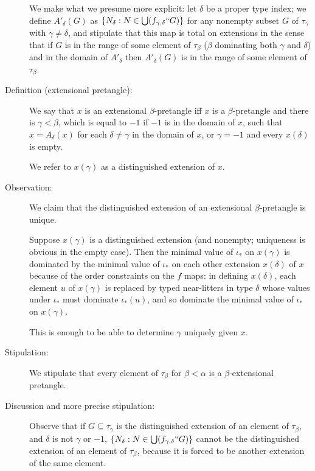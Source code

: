 \documentclass[112pt]{article}
\begin{document}
\begin{description}
We make what we presume more explicit:  let $\delta$ be a proper type index;  we define $A'_\delta(G)$ as $\{N_\delta:N \in \bigcup (f_{\gamma,\delta}``G)\}$ for any nonempty subset $G$ of $\tau_\gamma$ with $\gamma \neq \delta$, and stipulate that this map is total on extensions in the sense
that if $G$ is in the range of some element of $\tau_\beta$ ($\beta$ dominating both $\gamma$ and $\delta$) and in the domain of $A'_\delta$ then $A'_\delta(G)$ is in the range of some element of $\tau_\beta$.

\item[Definition (extensional pretangle):]  We say that $x$ is an extensional $\beta$-pretangle iff $x$ is a $\beta$-pretangle and there is 
$\gamma<\beta$, which is equal to $-1$ if $-1$ is in the domain of $x$, such that $x = A_\delta(x)$ for each $\delta \neq \gamma$ in the domain of $x$,
or $\gamma=-1$ and every $x(\delta)$ is empty.

We refer to $x(\gamma)$ as a distinguished extension of $x$.

\item[Observation:]  We claim that the distinguished extension of an extensional $\beta$-pretangle is unique.

Suppose $x(\gamma)$ is a distinguished extension (and nonempty; uniqueness is obvious in the empty case).  Then the minimal value of $\iota_*$ on $x(\gamma)$ is dominated by the minimal
value of $\iota_*$ on each other extension $x(\delta)$ of $x$ because of the order constraints on the $f$ maps:  in defining $x(\delta)$,
each element $u$ of $x(\gamma)$ is replaced by typed near-litters in type $\delta$ whose values under $\iota_*$ must dominate $\iota_*(u)$,
and so dominate the minimal value of $\iota_*$ on $x(\gamma)$.

This is enough to be able to determine $\gamma$ uniquely given $x$.

\item[Stipulation:]  We stipulate that every element of $\tau_\beta$ for $\beta<\alpha$ is a $\beta$-extensional pretangle.

\item[Discussion and more precise stipulation:]  Observe that if $G \subseteq \tau_\gamma$ is the distinguished extension of an element of $\tau_\beta$, 
and $\delta$ is not $\gamma$ or $-1$, $\{N_\delta:N \in \bigcup (f_{\gamma,\delta}``G)\}$ cannot be the distinguished extension
of an element of $\tau_\beta$, because it is forced to be another extension of the same element.


\end{description}
\end{document}
